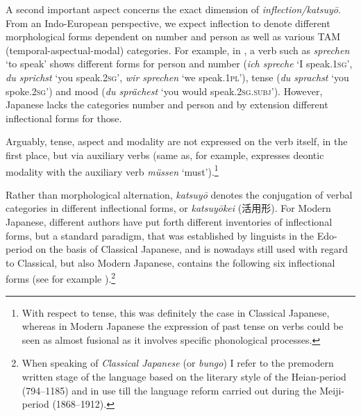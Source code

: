 \documentclass[output=paper,colorlinks,citecolor=brown]{langscibook}
\begin{document}
A second important aspect concerns the exact dimension of \emph{inflection/katsuyō}. From an Indo-European perspective, we expect inflection to denote different morphological forms dependent on number and person as well as various TAM (temporal-aspectual-modal) categories. For example, in , a verb such as \emph{sprechen} `to speak' shows different forms for person and number (\emph{ich spreche} `I speak.\textsc{1sg'}, \emph{du sprichst} `you speak.\textsc{2sg'}, \emph{wir sprechen} `we speak.\textsc{1pl'}), tense (\emph{du sprachst} `you spoke.\textsc{2sg'}) and mood (\emph{du sprächest} `you would speak.\textsc{2sg.subj'}). However, Japanese lacks the categories number and person and by extension different inflectional forms for those.

Arguably, tense, aspect and modality are not expressed on the verb itself, in the first place, but via auxiliary verbs (same as, for example,  expresses deontic modality with the auxiliary verb \emph{müssen} `must’).\footnote{With respect to tense, this was definitely the case in Classical Japanese, whereas in Modern Japanese the expression of past tense on verbs could be seen as almost fusional as it involves specific phonological processes.}

Rather than morphological alternation, \emph{katsuyō} denotes the conjugation of verbal categories in different inflectional forms, or \emph{katsuyōkei} ({\japanesefont 活用形}). For Modern Japanese, different authors have put forth different inventories of inflectional forms, but a standard paradigm, that was established by linguists in the Edo-period on the basis of Classical Japanese, and is nowadays still used with regard to Classical, but also Modern Japanese, contains the following six inflectional forms (see for example \citealt[222]{shibatani1990}).\footnote{When speaking of \emph{Classical Japanese} (or \emph{bungo}) I refer to the premodern written stage of the language based on the literary style of the Heian-period (794--1185) and in use till the language reform carried out during the Meiji-period (1868--1912).}
\end{document}
